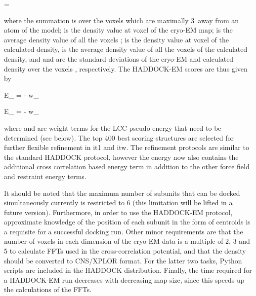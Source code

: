 \startformula
{} = 
\stopformula

where the summation is over the voxels  which are maximally 3\Angstrom\ away from an
atom of the model;  is the density value at voxel  of the cryo-EM
map;  is the average density value of all the voxels ;
 is the density value at voxel  of the calculated density,
 is the average density value of all the voxels  of the
calculated density, and  and  are the standard
deviations of the cryo-EM and calculated density over the voxels ,
respectively. The HADDOCK-EM scores are thus given by

\placeformula[eq:haddock-em-it0]
\startformula
E_{} = \Eitr - w_{} \cdot {}
\stopformula

\startformula
E_{} = \Eitf - w_{} \cdot {}
\stopformula

where  and  are weight terms for the LCC
pseudo energy that need to be determined (see below). The top 400 best scoring
structures are selected for further flexible refinement in it1 and itw.  The
refinement protocols are similar to the standard HADDOCK protocol, however the
energy now also contains the additional cross correlation based energy term in
addition to the other force field and restraint energy terms. 

It should be noted that the maximum number of subunits that can be docked
simultaneously currently is restricted to 6 (this limitation will be lifted in
a future version).  Furthermore, in order to use the HADDOCK-EM protocol,
approximate knowledge of the position of each subunit in the form of centroids
is a requisite for a successful docking run.  Other minor requirements are that
the number of voxels in each dimension of the cryo-EM data is a multiple of 2,
3 and 5 to calculate FFTs used in the cross-correlation potential, and that the
density should be converted to CNS/XPLOR format.  For the latter two tasks,
Python scripts are included in the HADDOCK distribution.  Finally, the time
required for a HADDOCK-EM run decreases with decreasing map size, since this
speeds up the calculations of the FFTs.




